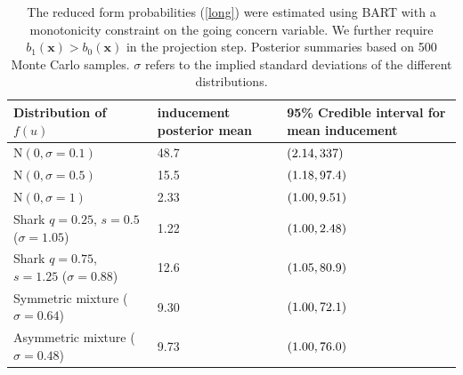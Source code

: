 \documentclass[aoas,preprint, 11pt, dvipsnames, table, x11name]{imsart}
\newcommand{\N}{\mbox{N}}
\renewcommand{\bm}[1]{\mathbf{#1}}
\theoremstyle{remark}
\begin{document}
	\begin{table}[!httb]
		\centering
		
		\begin{tabular}{lP{1.9cm}P{2.9cm}}
			
			\toprule
			Distribution of $f(u)$   &inducement posterior mean &95\% Credible interval for mean inducement \\ \midrule
			$\N(0,\sigma=0.1)$ &48.7&$\qty(2.14, 337)$\\ %
			$\N(0,\sigma=0.5)$&15.5 &$\qty(1.18,97.4)$\\%
			$\N(0,\sigma=1)$&2.33&$\qty(1.00, 9.51)$\\
			Shark $q=0.25$, $s=0.5$ ($\sigma=1.05$)&1.22&$\qty(1.00, 2.48)$\\
			Shark $q=0.75$, $s=1.25$ ($\sigma=0.88$)&12.6&$\qty(1.05, 80.9)$\\
			Symmetric mixture ($\sigma=0.64$)&9.30&$\qty(1.00, 72.1)$\\
			Asymmetric mixture ($\sigma=0.48$) &9.73&$\qty(1.00, 76.0)$\\
			
			
			\bottomrule%
		\end{tabular}
		\caption{The reduced form probabilities (\ref{long}) were estimated using BART with a monotonicity constraint on the going concern variable.  We further require $b_1(\bm{x})>b_0(\bm{x})$ in the projection step. Posterior summaries based on 500 Monte Carlo samples. $\sigma$ refers to the implied standard deviations of the different distributions. }
		\label{resultssummary_rr}
	\end{table}
	
\end{document}
